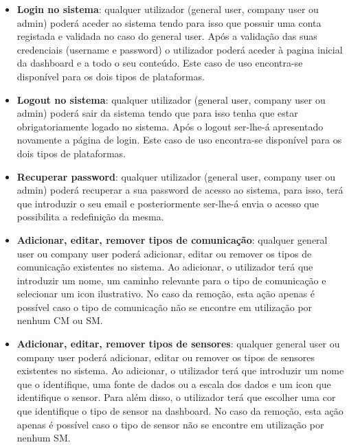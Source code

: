 \newpage

\begin{itemize}
	\item \textbf{Login no sistema}: qualquer utilizador (general user, company user ou admin) poderá aceder ao sistema tendo para isso que possuir uma conta registada e validada no caso do general user. Após a validação das suas credenciais (username e password) o utilizador poderá aceder à pagina inicial da dashboard e a todo o seu conteúdo. Este caso de uso encontra-se disponível para os dois tipos de plataformas. 
	
	
	\item \textbf{Logout no sistema}: qualquer utilizador (general user, company user ou admin) poderá sair da sistema tendo que para isso tenha que estar obrigatoriamente logado no sistema. Após o logout ser-lhe-á apresentado novamente a página de login. Este caso de uso encontra-se disponível para os dois tipos de plataformas. 
	
	
	\item \textbf{Recuperar password}: qualquer utilizador (general user, company user ou admin) poderá recuperar a sua password de acesso ao sistema, para isso, terá que introduzir o seu email e posteriormente ser-lhe-á envia o acesso que possibilita a redefinição da mesma. 
	
	
	
	\item \textbf{Adicionar, editar, remover tipos de comunicação}: qualquer general user ou company user poderá adicionar, editar ou remover os tipos de comunicação existentes no sistema. Ao  adicionar, o utilizador terá que introduzir um nome, um caminho relevante para o tipo de comunicação e selecionar um icon ilustrativo. No caso da remoção, esta ação apenas é possível caso o tipo de comunicação não se encontre em utilização por nenhum \ac{CM} ou \ac{SM}.  
	
	\item \textbf{Adicionar, editar, remover tipos de sensores}: qualquer general user ou company user poderá adicionar, editar ou remover os tipos de sensores existentes no sistema. Ao  adicionar, o utilizador terá que introduzir um nome que o identifique, uma fonte de dados ou a escala dos dados  e um icon que identifique o sensor. Para além disso, o utilizador terá que escolher uma cor que identifique o tipo de sensor na dashboard. No caso da remoção, esta ação apenas é possível caso o tipo de sensor não se encontre em utilização por nenhum \ac{SM}.   
	 

\end{itemize}
